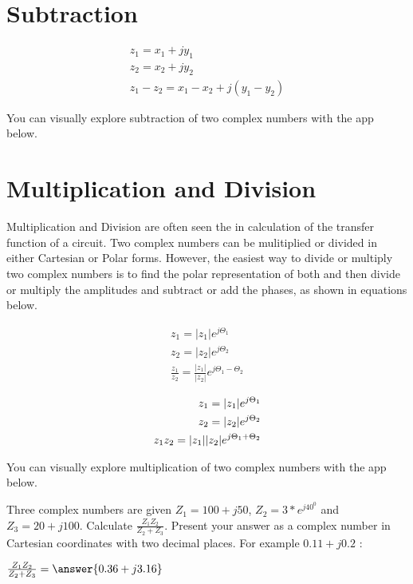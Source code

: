 \documentclass{ximera}
\begin{document}
\section{Subtraction}


\begin{eqnarray}
z_1=x_1 + j y_1 \nonumber \\
z_2=x_2 + j y_2 \nonumber \\
z_1-z_2 = x_1 - x_2 + j ( y_1 - y_2)
\end{eqnarray} 


You can visually explore subtraction of two complex numbers with the app below.
 \begin{center}  
\end{center} 

\section{Multiplication and Division}

Multiplication and Division are often seen the in calculation of the transfer function of a circuit. Two complex numbers can be mulitiplied or divided in either Cartesian or Polar forms. However, the easiest way to divide or multiply two complex numbers is to find the polar representation of both and then divide or multiply the amplitudes  and subtract or add the phases, as shown in equations below.



\begin{eqnarray}
z_1=|z_1| e^{j \Theta_1} \nonumber \\ 
z_2=|z_2| e^{j \Theta_2} \nonumber \\
\frac{z_1}{ z_2} = \frac{|z_1|}{|z_2|} e^{j \Theta_1 -\Theta_2}
\end{eqnarray}
  

\begin{eqnarray}
z_1=|z_1| e^{j \Theta_1} \nonumber \\
z_2=|z_2| e^{j \Theta_2} \nonumber \\
z_1 z_2 = |z_1|}{|z_2| e^{j \Theta_1 +\Theta_2}
\end{eqnarray}



You can visually explore multiplication of two complex numbers with the app below.

    
   
 \begin{center}  
\end{center} 
    
    
\begin{question}
Three complex numbers are given $Z_1=100+j50$, $Z_2=3*e^{j40^0}$ and  $Z_3=20+j100$. Calculate $\frac{Z_1 Z_2}{Z_2+Z_3}$. Present your answer as a complex number in Cartesian coordinates with two decimal places. For example $0.11+j0.2$ :
  
$\frac{Z_1 Z_2}{Z_2+Z_3} = \answer{0.36+j3.16}$  
\end{question} 
\end{document}
